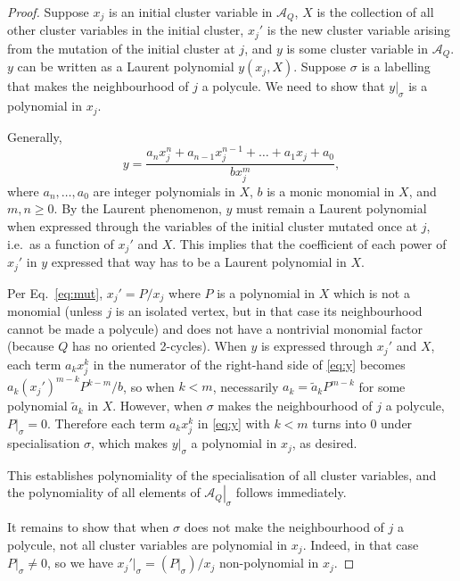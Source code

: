 \documentclass[10pt,a4paper]{amsart}
\newcommand{\sA}{\left.\mathcal{A}_Q\right|_\sigma}
\begin{document}
\begin{proof}
Suppose $x_j$ is an initial cluster variable in $\mathcal{A}_Q$, $X$ is the collection of all other cluster variables in the initial cluster, $x_j'$ is the new cluster variable arising from the mutation of the initial cluster at $j$, and $y$ is some cluster variable in $\mathcal{A}_Q$. $y$ can be written as a Laurent polynomial $y(x_j,X)$. Suppose $\sigma$ is a labelling that makes the neighbourhood of $j$ a polycule. We need to show that $y|_\sigma$ is a polynomial in $x_j$.

Generally,
\begin{equation}
\label{eq:y}
y = \frac{a_nx_j^n + a_{n-1}x_j^{n-1}+\ldots+a_1x_j+a_0}{bx_j^m},
\end{equation}
where $a_n,\ldots,a_0$ are integer polynomials in $X$, $b$ is a monic monomial in $X$, and $m,n\geqslant0$. By the Laurent phenomenon, $y$ must remain a Laurent polynomial when expressed through the variables of the initial cluster mutated once at $j$, i.e.\ as a function of $x_j'$ and $X$. This implies that the coefficient of each power of $x_j'$ in $y$ expressed that way has to be a Laurent polynomial in $X$.

Per Eq.~\eqref{eq:mut}, $x_j'=P/x_j$ where $P$ is a polynomial in $X$ which is not a monomial (unless $j$ is an isolated vertex, but in that case its neighbourhood cannot be made a polycule) and does not have a nontrivial monomial factor (because $Q$ has no oriented 2-cycles). When $y$ is expressed through $x_j'$ and $X$, each term $a_kx_j^k$ in the numerator of the right-hand side of \eqref{eq:y} becomes $a_k(x_j')^{m-k}P^{k-m}/b$, so when $k<m$, necessarily $a_k = \tilde{a}_kP^{m-k}$ for some polynomial $\tilde{a}_k$ in $X$. However, when $\sigma$ makes the neighbourhood of $j$ a polycule, $P|_\sigma=0$. Therefore each term $a_kx_j^k$ in \eqref{eq:y} with $k<m$ turns into $0$ under specialisation $\sigma$, which makes $y|_\sigma$ a polynomial in $x_j$, as desired.

This establishes polynomiality of the specialisation of all cluster variables, and the polynomiality of all elements of $\sA$ follows immediately.

It remains to show that when $\sigma$ does not make the neighbourhood of $j$ a polycule, not all cluster variables are polynomial in $x_j$. Indeed, in that case $P|_\sigma\ne0$, so we have $x_j'|_\sigma=\left(P|_\sigma\right)/x_j$ non-polynomial in $x_j$.
\end{proof}
\end{document}
